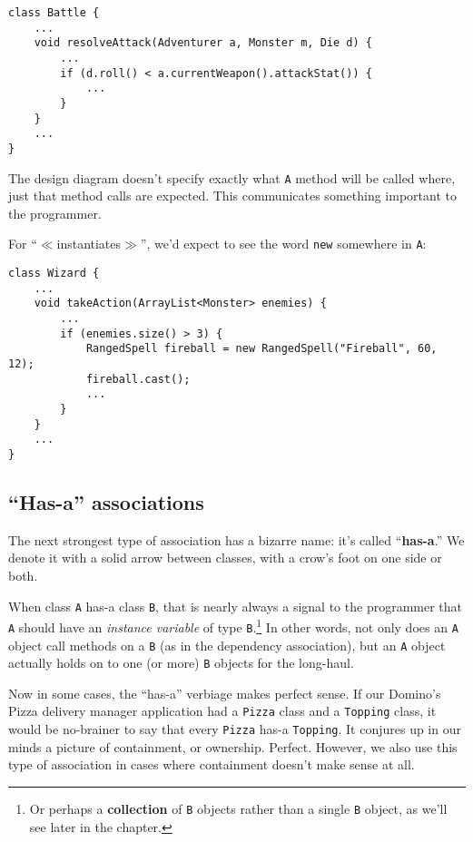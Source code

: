 \begin{Verbatim}[fontsize=\scriptsize,samepage=true,frame=single]
class Battle {
    ...
    void resolveAttack(Adventurer a, Monster m, Die d) {
        ...
        if (d.roll() < a.currentWeapon().attackStat()) {
            ...
        }
    }
    ...
}
\end{Verbatim}

The design diagram doesn't specify exactly what \texttt{A} method will be
called where, just that method calls are expected. This communicates something
important to the programmer.

For ``$\ll$instantiates$\gg$'', we'd expect to see the word \texttt{new}
somewhere in \texttt{A}:

\begin{Verbatim}[fontsize=\scriptsize,samepage=true,frame=single]
class Wizard {
    ...
    void takeAction(ArrayList<Monster> enemies) {
        ...
        if (enemies.size() > 3) {
            RangedSpell fireball = new RangedSpell("Fireball", 60, 12);
            fireball.cast();
            ...
        }
    }
    ...
}
\end{Verbatim}

\subsection{``Has-a'' associations}

The next strongest type of association has a bizarre name: it's called
``\textbf{has-a}.'' We denote it with a solid arrow between classes, with a
crow's foot on one side or both.

When class \texttt{A} has-a class \texttt{B}, that is nearly always a signal
to the programmer that \texttt{A} should have an \textit{instance variable} of
type \texttt{B}.\footnote{Or perhaps a \textbf{collection} of \texttt{B}
objects rather than a single \texttt{B} object, as we'll see later in the
chapter.} In other words, not only does an \texttt{A} object call
methods on a \texttt{B} (as in the dependency association), but an \texttt{A}
object actually holds on to one (or more) \texttt{B} objects for the
long-haul.

Now in some cases, the ``has-a'' verbiage makes perfect sense. If our Domino's
Pizza delivery manager application had a \texttt{Pizza} class and a
\texttt{Topping} class, it would be no-brainer to say that every
\texttt{Pizza} has-a \texttt{Topping}. It conjures up in our minds a picture
of containment, or ownership. Perfect. However, we also use this type of
association in cases where containment doesn't make sense at all.

